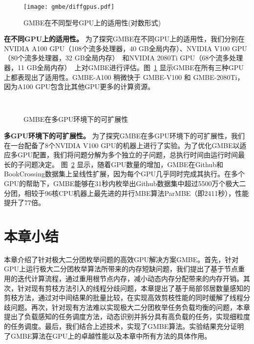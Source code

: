 \begin{figure} [H]
	\centering
	\texttt{[image: gmbe/diffgpus.pdf]}	
	\vspace{0.1in}
  \caption{GMBE在不同型号GPU上的适用性(对数形式)}
	\label{fig:gmbe_exp_diff}
\end{figure}

\textbf{在不同GPU上的适用性。} 为了探究GMBE在不同GPU上的适用性，我们分别在NVIDIA A100 GPU（108个流多处理器，40 GB全局内存）、NVIDIA V100 GPU（80个流多处理器，32 GB全局内存）~\cite{NVIDIA-V100}和NVIDIA 2080Ti GPU（68个流多处理器，11 GB全局内存）~\cite{NVIDIA-2080Ti}上对GMBE进行评估。图~\ref{fig:gmbe_exp_diff} 显示GMBE在所有三种GPU上都表现出了适用性。GMBE-A100 稍微快于 GMBE-V100 和 GMBE-2080Ti，因为A100 GPU包含比其他GPU更多的计算资源。

\begin{figure} [t]
	\centering

	 \\


	\caption{GMBE在多GPU环境下的可扩展性}

	\label{fig:gmbe_exp_scale}

\end{figure}

\textbf{多GPU环境下的可扩展性。} 为了探究GMBE在多GPU环境下的可扩展性，我们在一台配备了8个NVIDIA V100 GPU的机器上进行了实验。为了优化GMBE以适应多GPU配置，我们将问题分解为多个独立的子问题，总执行时间由运行时间最长的子问题决定。 图~\ref{fig:gmbe_exp_scale} 显示，随着GPU数量的增加，GMBE在Github和BookCrossing数据集上呈线性扩展，因为每个GPU几乎同时完成其执行。在多个GPU的帮助下，GMBE能够在31秒内枚举出Github数据集中超过5500万个极大二分团，相较于96核CPU机器上最先进的并行MBE算法ParMBE（即2411秒），性能提升了77倍。

\section{本章小结}

本章介绍了针对极大二分团枚举问题的高效GPU解决方案GMBE。首先，针对GPU上运行极大二分团枚举算法所带来的内存短缺问题，我们提出了基于节点重用的迭代计算流程，通过重用根节点内存，减小动态内存分配带来的内存开销。其次，针对现有剪枝方法引入的线程分歧问题，本章提出了基于局部邻居数量感知的剪枝方法，通过对中间结果的批量比较，在实现高效剪枝性能的同时缓解了线程分歧问题。再次，针对现有方法难以实现极大二分团枚举任务负载均衡的问题，本章提出了负载感知的任务调度方法，动态识别并拆分具有高负载的任务，实现细粒度的任务调度。最后，我们结合上述技术，实现了GMBE算法。实验结果充分证明了GMBE算法在GPU上的卓越性能以及本章中所有方法的具体作用。